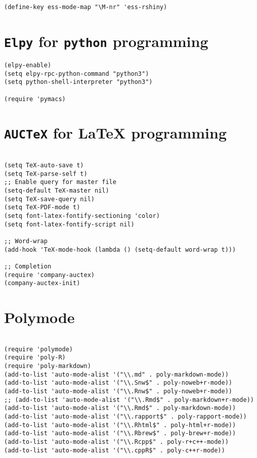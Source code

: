 \documentclass[11pt]{article}
\begin{document}
\begin{verbatim}
(define-key ess-mode-map "\M-nr" 'ess-rshiny)

\end{verbatim}

\section{\texttt{Elpy} for \texttt{python} programming}
\label{sec:org9d63e8f}

\begin{verbatim}
(elpy-enable)				
(setq elpy-rpc-python-command "python3")
(setq python-shell-interpreter "python3")

(require 'pymacs)

\end{verbatim}

\section{\texttt{AUCTeX} for \LaTeX{} programming}
\label{sec:org1a4a5cc}
\begin{verbatim}

(setq TeX-auto-save t)			    
(setq TeX-parse-self t)
;; Enable query for master file
(setq-default TeX-master nil)		    
(setq TeX-save-query nil)		    
(setq TeX-PDF-mode t)			    
(setq font-latex-fontify-sectioning 'color) 
(setq font-latex-fontify-script nil)	    

;; Word-wrap
(add-hook 'TeX-mode-hook (lambda () (setq-default word-wrap t)))

;; Completion
(require 'company-auctex)
(company-auctex-init)

\end{verbatim}

\section{Polymode}
\label{sec:org96df92f}

\begin{verbatim}

(require 'polymode)
(require 'poly-R)
(require 'poly-markdown)
(add-to-list 'auto-mode-alist '("\\.md" . poly-markdown-mode))
(add-to-list 'auto-mode-alist '("\\.Snw$" . poly-noweb+r-mode))
(add-to-list 'auto-mode-alist '("\\.Rnw$" . poly-noweb+r-mode))
;; (add-to-list 'auto-mode-alist '("\\.Rmd$" . poly-markdown+r-mode))
(add-to-list 'auto-mode-alist '("\\.Rmd$" . poly-markdown-mode))
(add-to-list 'auto-mode-alist '("\\.rapport$" . poly-rapport-mode))
(add-to-list 'auto-mode-alist '("\\.Rhtml$" . poly-html+r-mode))
(add-to-list 'auto-mode-alist '("\\.Rbrew$" . poly-brew+r-mode))
(add-to-list 'auto-mode-alist '("\\.Rcpp$" . poly-r+c++-mode))
(add-to-list 'auto-mode-alist '("\\.cppR$" . poly-c++r-mode))
\end{verbatim}
\end{document}
